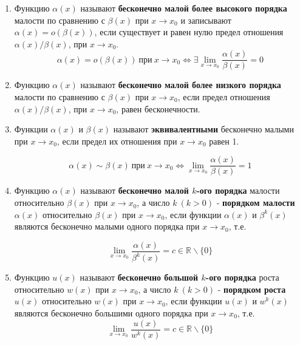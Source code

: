 \begin{enumerate}
\item Функцию $\alpha(x)$ называют \textbf{бесконечно малой более высокого порядка} малости по сравнению с $\beta(x)$ при $x \rightarrow x_0$ и записывают $\alpha(x) = o(\beta(x))$, если существует и равен нулю предел отношения $\alpha(x) / \beta(x)$, при $x \rightarrow x_0$. $$\alpha(x) = o(\beta(x)) \ \text{при} \ x \rightarrow x_0 \iff \exists \lim\limits_{x \to x_0} {\frac{\alpha(x)}{\beta(x)}} = 0$$
\item Функцию $\alpha(x)$ называют \textbf{бесконечно малой более низкого порядка} малости по сравнению с $\beta(x)$ при $x \rightarrow x_0$, если предел отношения $\alpha(x) / \beta(x)$, при $x \rightarrow x_0$, равен бесконечности.
\item Функции $\alpha(x)$ и $\beta(x)$ называют \textbf{эквивалентными} бесконечно малыми при $x \rightarrow x_0$, если предел их отношения при $x \rightarrow x_0$ равен 1.

$$\alpha(x) \sim \beta(x) \ \text{при} \ x \rightarrow x_0 \iff \lim\limits_{x \to x_0}{\frac{\alpha(x)}{\beta(x)}} = 1$$
\item Функцию $\alpha(x)$ называют \textbf{бесконечно малой $k$-ого порядка} малости относительно $\beta(x)$ при $x \rightarrow x_0$, а число $k \ (k > 0)$ - \textbf{порядком малости} $\alpha(x)$ относительно $\beta(x)$ при $x \rightarrow x_0$, если функции $\alpha(x)$ и $\beta^k(x)$ являются бесконечно малыми одного порядка при $x \rightarrow x_0$, т.е.

$$\lim\limits_{x \to x_0} {\frac{\alpha(x)}{\beta^k(x)}} = c \in \mathbb{R} \backslash \{0\}$$
\item Функцию $u(x)$ называют \textbf{бесконечно большой $k$-ого порядка} роста относительно $w(x)$ при $x \rightarrow x_0$, а число $k \ (k > 0)$ - \textbf{порядком роста} $u(x)$ относительно $w(x)$ при $x \rightarrow x_0$, если функции $u(x)$ и $w^k(x)$ являются бесконечно большими одного порядка при $x \rightarrow x_0$, т.е. $$\lim\limits_{x \to x_0} {\frac{u(x)}{w^k(x)}} = c \in \mathbb{R} \backslash \{0\}$$


\end{enumerate}
